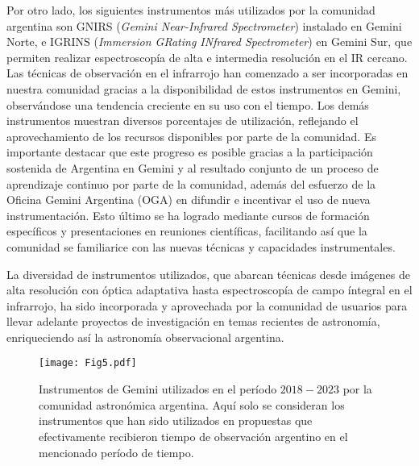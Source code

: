 \documentclass[baaa]{baaa}
\begin{document}
Por otro lado, los siguientes instrumentos más utilizados por la comunidad argentina son GNIRS ({\em Gemini Near-Infrared Spectrometer}) instalado en Gemini Norte, e IGRINS ({\em Immersion GRating INfrared Spectrometer}) en Gemini Sur, que permiten realizar espectroscopía de alta e intermedia resolución en el IR cercano. Las técnicas de observación en el infrarrojo han comenzado a ser incorporadas en nuestra comunidad gracias a la disponibilidad de estos instrumentos en Gemini, observándose una tendencia creciente en su uso con el tiempo.
Los demás instrumentos muestran diversos porcentajes de utilización, reflejando el aprovechamiento de los recursos disponibles por parte de la comunidad.
Es importante destacar que este progreso es posible gracias a la participación sostenida de Argentina en Gemini y al resultado conjunto de un proceso de aprendizaje continuo por parte de la comunidad, además del esfuerzo de la Oficina Gemini Argentina (OGA) en difundir e incentivar el uso de nueva instrumentación. Esto último se ha logrado mediante cursos de formación específicos y presentaciones en reuniones científicas, facilitando así que la comunidad se familiarice con las nuevas técnicas y capacidades instrumentales.

La diversidad de instrumentos utilizados, que abarcan técnicas desde imágenes de alta resolución con óptica adaptativa hasta espectroscopía de campo íntegral en el infrarrojo, ha sido incorporada y aprovechada por la comunidad de usuarios para llevar adelante proyectos de investigación en temas recientes de astronomía, enriqueciendo así la astronomía observacional argentina.


\begin{figure}[!t]
\centering
\texttt{[image: Fig5.pdf]}
\caption{Instrumentos de Gemini utilizados en el período $2018-2023$ por la comunidad astronómica argentina. Aquí solo se consideran los instrumentos que han sido utilizados en propuestas que efectivamente recibieron tiempo de observación argentino en el mencionado período de tiempo.}
\label{fig5}
\end{figure}
\end{document}
